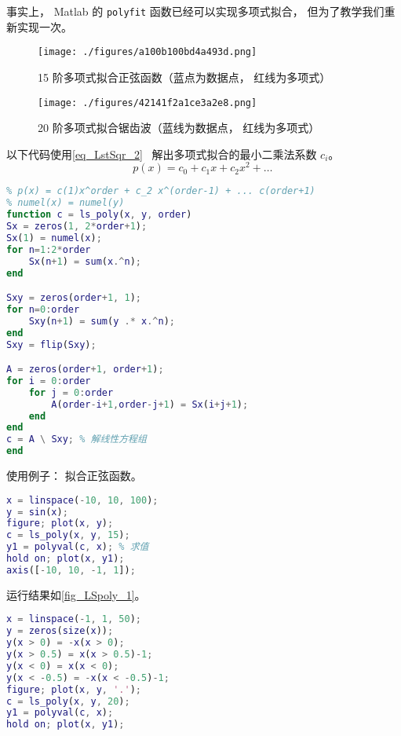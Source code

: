 

事实上， Matlab 的 \verb|polyfit| 函数已经可以实现多项式拟合， 但为了教学我们重新实现一次。
\begin{figure}[ht]
\centering
\texttt{[image: ./figures/a100b100bd4a493d.png]}
\caption{15 阶多项式拟合正弦函数（蓝点为数据点， 红线为多项式）} \label{fig_LSpoly_1}
\end{figure}

\begin{figure}[ht]
\centering
\texttt{[image: ./figures/42141f2a1ce3a2e8.png]}
\caption{20 阶多项式拟合锯齿波（蓝线为数据点， 红线为多项式）} \label{fig_LSpoly_2}
\end{figure}

以下代码使用\autoref{eq_LstSqr_2}~ 解出多项式拟合的最小二乘法系数 $c_i$。
\begin{equation}
p(x) = c_0 + c_1 x + c_2 x^2 + \dots~
\end{equation}

\begin{lstlisting}[language=matlab, caption=ls\_poly.m]
% 多项式最小二乘法拟合
% p(x) = c(1)x^order + c_2 x^(order-1) + ... c(order+1)
% numel(x) = numel(y)
function c = ls_poly(x, y, order)
Sx = zeros(1, 2*order+1);
Sx(1) = numel(x);
for n=1:2*order
    Sx(n+1) = sum(x.^n);
end

Sxy = zeros(order+1, 1);
for n=0:order
    Sxy(n+1) = sum(y .* x.^n);
end
Sxy = flip(Sxy);

A = zeros(order+1, order+1);
for i = 0:order
    for j = 0:order
        A(order-i+1,order-j+1) = Sx(i+j+1);
    end
end
c = A \ Sxy; % 解线性方程组
end
\end{lstlisting}

使用例子： 拟合正弦函数。
\begin{lstlisting}[language=matlab, caption=ls\_poly\_demo.m]
% ls_poly_demo
x = linspace(-10, 10, 100);
y = sin(x);
figure; plot(x, y);
c = ls_poly(x, y, 15);
y1 = polyval(c, x); % 求值
hold on; plot(x, y1);
axis([-10, 10, -1, 1]);
\end{lstlisting}
运行结果如\autoref{fig_LSpoly_1}。

\begin{lstlisting}[language=matlab, caption=ls\_poly\_demo2.m]
% ls_poly_demo2
x = linspace(-1, 1, 50);
y = zeros(size(x));
y(x > 0) = -x(x > 0);
y(x > 0.5) = x(x > 0.5)-1;
y(x < 0) = x(x < 0);
y(x < -0.5) = -x(x < -0.5)-1;
figure; plot(x, y, '.');
c = ls_poly(x, y, 20);
y1 = polyval(c, x);
hold on; plot(x, y1);
\end{lstlisting}
